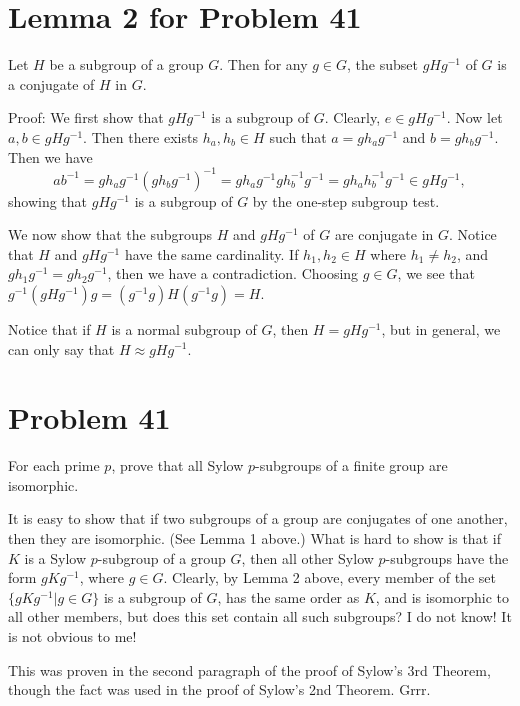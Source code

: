 \documentclass{article}
\begin{document}
\section*{Lemma 2 for Problem 41}

Let $H$ be a subgroup of a group $G$.  Then for any $g\in G$,
the subset $gHg^{-1}$ of $G$ is a conjugate of $H$ in $G$.

Proof:  We first show that $gHg^{-1}$ is a subgroup of $G$.
Clearly, $e\in gHg^{-1}$.  Now let $a,b\in gHg^{-1}$.  Then
there exists $h_a,h_b\in H$ such that $a=gh_ag^{-1}$ and $b=gh_bg^{-1}$.
Then we have
\begin{equation*}
ab^{-1}=gh_ag^{-1}(gh_bg^{-1})^{-1}=gh_ag^{-1}gh_b^{-1}g^{-1}=gh_ah_b^{-1}g^{-1}
\in gHg^{-1},
\end{equation*}
showing that $gHg^{-1}$ is a subgroup of $G$ by the one-step subgroup test.

We now show that the subgroups $H$ and $gHg^{-1}$ of $G$ are conjugate in $G$.
Notice that $H$ and $gHg^{-1}$ have the same cardinality.  If $h_1,h_2\in H$
where $h_1\neq h_2$, and $gh_1g^{-1}=gh_2g^{-1}$, then we have a contradiction.
Choosing $g\in G$, we see that $g^{-1}(gHg^{-1})g=(g^{-1}g)H(g^{-1}g)=H$.

Notice that if $H$ is a normal subgroup of $G$, then $H=gHg^{-1}$, but
in general, we can only say that $H\approx gHg^{-1}$.

\section*{Problem 41}

For each prime $p$, prove that all Sylow $p$-subgroups of a finite group
are isomorphic.

It is easy to show that if two subgroups of a group are conjugates of one
another, then they are isomorphic.  (See Lemma 1 above.)
What is hard to show is that if
$K$ is a Sylow $p$-subgroup of a group $G$, then all other Sylow
$p$-subgroups have the form $gKg^{-1}$, where $g\in G$.  Clearly, by Lemma 2
above, every
member of the set $\{gKg^{-1}|g\in G\}$ is a subgroup of $G$, has
the same order as $K$, and is isomorphic
to all other members, but does this set contain all such subgroups?
I do not know!  It is not obvious to me!

This was proven in the second paragraph of the proof of Sylow's
3rd Theorem, though the fact was used in the proof of Sylow's 2nd Theorem.
Grrr.
\end{document}
